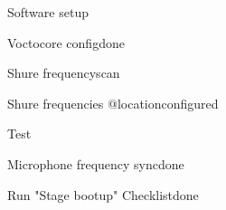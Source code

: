 \begin{checklist}{Software setup}
  \item{Voctocore config}{done}
  \item{Shure frequency}{scan}
  \item{Shure frequencies @location}{configured}
\end{checklist}

\begin{checklist}{Test}
  \item{Microphone frequency sync}{done}
  \item{Run "Stage bootup" Checklist}{done}
\end{checklist}


